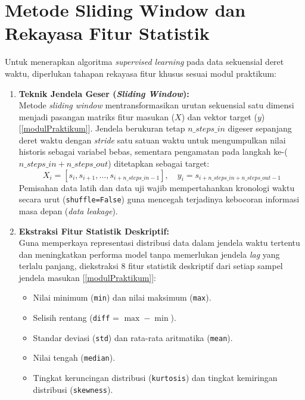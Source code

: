 \section{Metode Sliding Window dan Rekayasa Fitur Statistik}
Untuk menerapkan algoritma \textit{supervised learning} pada data sekuensial deret waktu, diperlukan tahapan rekayasa fitur khusus sesuai modul praktikum:
\begin{enumerate}
    \item \textbf{Teknik Jendela Geser (\textit{Sliding Window}):}\\
    Metode \textit{sliding window} mentransformasikan urutan sekuensial satu dimensi menjadi pasangan matriks fitur masukan ($X$) dan vektor target ($y$) [\ref{modulPraktikum}]. Jendela berukuran tetap $n\_steps\_in$ digeser sepanjang deret waktu dengan \textit{stride} satu satuan waktu untuk mengumpulkan nilai historis sebagai variabel bebas, sementara pengamatan pada langkah ke-($n\_steps\_in + n\_steps\_out$) ditetapkan sebagai target:
    \begin{equation}
        X_i = [s_i, s_{i+1}, \dots, s_{i+n\_steps\_in-1}], \quad y_i = s_{i+n\_steps\_in+n\_steps\_out-1}
    \end{equation}
    Pemisahan data latih dan data uji wajib mempertahankan kronologi waktu secara urut (\texttt{shuffle=False}) guna mencegah terjadinya kebocoran informasi masa depan (\textit{data leakage}).

    \item \textbf{Ekstraksi Fitur Statistik Deskriptif:}\\
    Guna memperkaya representasi distribusi data dalam jendela waktu tertentu dan meningkatkan performa model tanpa memerlukan jendela \textit{lag} yang terlalu panjang, diekstraksi 8 fitur statistik deskriptif dari setiap sampel jendela masukan [\ref{modulPraktikum}]:
    \begin{itemize}
        \item Nilai minimum (\texttt{min}) dan nilai maksimum (\texttt{max}).
        \item Selisih rentang (\texttt{diff} = $\max - \min$).
        \item Standar deviasi (\texttt{std}) dan rata-rata aritmatika (\texttt{mean}).
        \item Nilai tengah (\texttt{median}).
        \item Tingkat keruncingan distribusi (\texttt{kurtosis}) dan tingkat kemiringan distribusi (\texttt{skewness}).
    \end{itemize}
\end{enumerate}

